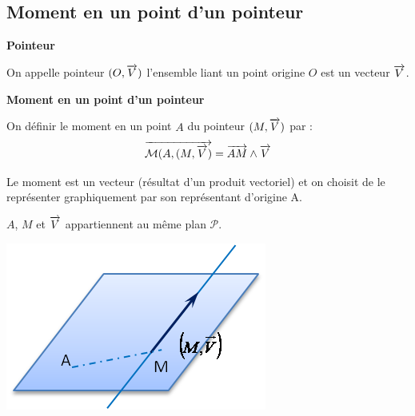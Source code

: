 \documentclass[10pt,oneside]{article}
\begin{document}
\subsection{Moment en un point d'un pointeur}

\begin{defi}
\textbf{Pointeur}

On appelle pointeur $(O,\overrightarrow{V})$ l'ensemble liant un point origine $O$ est un vecteur $\overrightarrow{V}$. 
\end{defi}

\begin{defi}
\textbf{Moment en un point d'un pointeur}

\begin{minipage}[c]{.5\linewidth}
On définir le moment en un point $A$ du pointeur $(M,\overrightarrow{V})$ par : 
$$
\overrightarrow{\mathcal{M}(A,(M,\overrightarrow{V})} = \overrightarrow{AM}\wedge\overrightarrow{V}
$$

Le moment est un vecteur (résultat d'un produit vectoriel) et on choisit de le représenter graphiquement par son représentant d'origine A. 

$A$, $M$ et $\overrightarrow{V}$ appartiennent au même plan $\mathcal{P}$. 
\end{minipage}\hfill
\begin{minipage}[c]{.4\linewidth}
\begin{center}
\includegraphics[width=.8\textwidth]{png/moment}
\end{center}
\end{minipage}
\end{defi}
\end{document}
